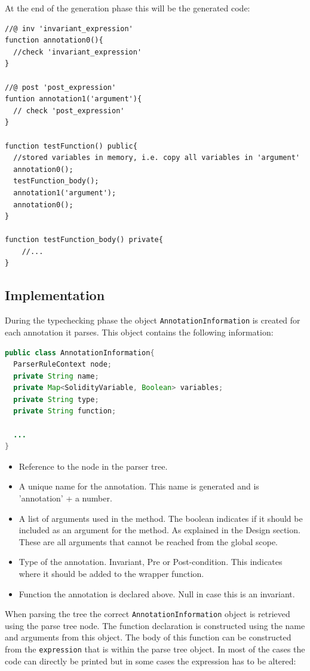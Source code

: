 \documentclass[a4paper]{article}
\begin{document}
At the end of the generation phase this will be the generated code:
\begin{lstlisting}[breaklines=true, language=Solidity ]
//@ inv 'invariant_expression'
function annotation0(){
  //check 'invariant_expression'
}

//@ post 'post_expression'
funtion annotation1('argument'){
  // check 'post_expression'
}

function testFunction() public{
  //stored variables in memory, i.e. copy all variables in 'argument'
  annotation0();
  testFunction_body();
  annotation1('argument');
  annotation0();
}

function testFunction_body() private{
    //...
}
\end{lstlisting}

\subsection{Implementation}
During the typechecking phase the object \texttt{AnnotationInformation} is created for each annotation it parses. This object contains the following information:
\begin{lstlisting}[breaklines=true, language=Java ]
public class AnnotationInformation{  
  ParserRuleContext node;
  private String name;
  private Map<SolidityVariable, Boolean> variables;
  private String type;
  private String function;

  ...
}
\end{lstlisting}
\begin{itemize}
  \item Reference to the node in the parser tree.
  \item A unique name for the annotation. This name is generated and is 'annotation' + a number.
  \item A list of arguments used in the method. The boolean indicates if it should be included as an argument for the method. As explained in the Design section. These are all arguments that cannot be reached from the global scope.
  \item Type of the annotation. Invariant, Pre or Post-condition. This indicates where it should be added to the wrapper function.
  \item Function the annotation is declared above. Null in case this is an invariant.
\end{itemize}
When parsing the tree the correct \texttt{AnnotationInformation} object is retrieved using the parse tree node. The function declaration is constructed using the name and arguments from this object. The body of this function can be constructed from the \texttt{expression} that is within the parse tree object. In most of the cases the code can directly be printed but in some cases the expression has to be altered:
\end{document}
